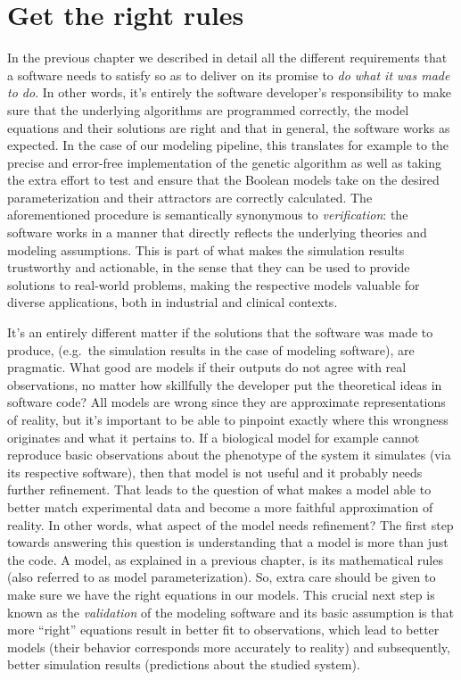 \documentclass[
  12pt,
]{book}
\begin{document}
\newpage

\hypertarget{gtrr}{%
\section*{Get the right rules}\label{gtrr}}

\indent

In the previous chapter we described in detail all the different requirements that a software needs to satisfy so as to deliver on its promise to \emph{do what it was made to do}.
In other words, it's entirely the software developer's responsibility to make sure that the underlying algorithms are programmed correctly, the model equations and their solutions are right and that in general, the software works as expected.
In the case of our modeling pipeline, this translates for example to the precise and error-free implementation of the genetic algorithm as well as taking the extra effort to test and ensure that the Boolean models take on the desired parameterization and their attractors are correctly calculated.
The aforementioned procedure is semantically synonymous to \emph{verification}: the software works in a manner that directly reflects the underlying theories and modeling assumptions.
This is part of what makes the simulation results trustworthy and actionable, in the sense that they can be used to provide solutions to real-world problems, making the respective models valuable for diverse applications, both in industrial and clinical contexts.

It's an entirely different matter if the solutions that the software was made to produce, (e.g.~the simulation results in the case of modeling software), are pragmatic.
What good are models if their outputs do not agree with real observations, no matter how skillfully the developer put the theoretical ideas in software code?
All models are wrong since they are approximate representations of reality, but it's important to be able to pinpoint exactly where this wrongness originates and what it pertains to.
If a biological model for example cannot reproduce basic observations about the phenotype of the system it simulates (via its respective software), then that model is not useful and it probably needs further refinement.
That leads to the question of what makes a model able to better match experimental data and become a more faithful approximation of reality.
In other words, what aspect of the model needs refinement?
The first step towards answering this question is understanding that a model is more than just the code.
A model, as explained in a previous chapter, is its mathematical rules (also referred to as model parameterization).
So, extra care should be given to make sure we have the right equations in our models.
This crucial next step is known as the \emph{validation} of the modeling software and its basic assumption is that more ``right'' equations result in better fit to observations, which lead to better models (their behavior corresponds more accurately to reality) and subsequently, better simulation results (predictions about the studied system).
\end{document}
